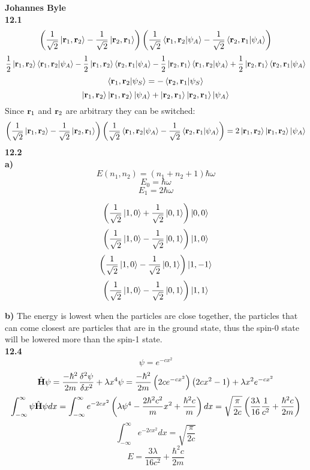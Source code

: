 \documentclass[english]{article}
\begin{document}
\textbf{Johannes Byle}\\
\textbf{12.1}
$$\left(\frac{1}{\sqrt{2}}\ket{\vb{r}_1,\vb{r}_2}-\frac{1}{\sqrt{2}}\ket{\vb{r}_2,\vb{r}_1}\right)\left(\frac{1}{\sqrt{2}}\bra{\vb{r}_1,\vb{r}_2}\ket{\psi_A}-\frac{1}{\sqrt{2}}\bra{\vb{r}_2,\vb{r}_1}\ket{\psi_A}\right)$$
$$\frac{1}{2}\ket{\vb{r}_1,\vb{r}_2}\bra{\vb{r}_1,\vb{r}_2}\ket{\psi_A}-\frac{1}{2}\ket{\vb{r}_1,\vb{r}_2}\bra{\vb{r}_2,\vb{r}_1}\ket{\psi_A}-\frac{1}{2}\ket{\vb{r}_2,\vb{r}_1}\bra{\vb{r}_1,\vb{r}_2}\ket{\psi_A}+\frac{1}{2}\ket{\vb{r}_2,\vb{r}_1}\bra{\vb{r}_2,\vb{r}_1}\ket{\psi_A}$$
$$\bra{\vb{r}_1,\vb{r}_2}\ket{\psi_S}=-\bra{\vb{r}_2,\vb{r}_1}\ket{\psi_S}$$
$$\ket{\vb{r}_1,\vb{r}_2}\ket{\vb{r}_1,\vb{r}_2}\ket{\psi_A}+\ket{\vb{r}_2,\vb{r}_1}\ket{\vb{r}_2,\vb{r}_1}\ket{\psi_A}$$
Since $\vb{r}_1$ and $\vb{r}_2$ are arbitrary they can be switched:
$$\left(\frac{1}{\sqrt{2}}\ket{\vb{r}_1,\vb{r}_2}-\frac{1}{\sqrt{2}}\ket{\vb{r}_2,\vb{r}_1}\right)\left(\frac{1}{\sqrt{2}}\bra{\vb{r}_1,\vb{r}_2}\ket{\psi_A}-\frac{1}{\sqrt{2}}\bra{\vb{r}_2,\vb{r}_1}\ket{\psi_A}\right)=2\ket{\vb{r}_1,\vb{r}_2}\ket{\vb{r}_1,\vb{r}_2}\ket{\psi_A}$$
\textbf{12.2}\\
\textbf{a)}
$$E\left(n_1,n_2\right)=\left(n_1+n_2+1\right)\hbar\omega$$
$$E_0=\hbar\omega$$
$$E_1=2\hbar\omega$$
\begin{multicols}{2}
$$\left(\frac{1}{\sqrt{2}}\ket{1,0}+\frac{1}{\sqrt{2}}\ket{0,1}\right)\ket{0,0}$$
$$\left(\frac{1}{\sqrt{2}}\ket{1,0}-\frac{1}{\sqrt{2}}\ket{0,1}\right)\ket{1,0}$$
$$\left(\frac{1}{\sqrt{2}}\ket{1,0}-\frac{1}{\sqrt{2}}\ket{0,1}\right)\ket{1,-1}$$
$$\left(\frac{1}{\sqrt{2}}\ket{1,0}-\frac{1}{\sqrt{2}}\ket{0,1}\right)\ket{1,1}$$
\end{multicols}
\textbf{b)}
The energy is lowest when the particles are close together, the particles that can come closest are particles that are in the ground state, thus the spin-0 state will be lowered more than the spin-1 state.\\
\textbf{12.4}\\
$$\psi=e^{-cx^2}$$
$$\hat{\vb{H}}\psi=\frac{-\hbar^2}{2m}\frac{\delta^2\psi}{\delta x^2}+\lambda x^4\psi=\frac{-\hbar^2}{2m}\left(2ce^{-cx^2}\right)\left(2cx^2-1\right)+\lambda x^2e^{-cx^2}$$
$$\int_{-\infty}^{\infty}\psi\hat{\vb{H}}\psi dx=\int_{-\infty}^{\infty}e^{-2cx^2}\left(\lambda\psi^4-\frac{2\hbar^2c^2}{m}x^2+\frac{\hbar^2c}{m}\right)dx=\sqrt{\frac{\pi}{2c}}\left(\frac{3\lambda}{16}\frac{1}{c^2}+\frac{\hbar^2c}{2m}\right)$$
$$\int_{-\infty}^{\infty}e^{-2cx^2}dx=\sqrt{\frac{\pi}{2c}}$$
$$E=\frac{3\lambda}{16c^2}+\frac{\hbar^2c}{2m}$$
\end{document}
